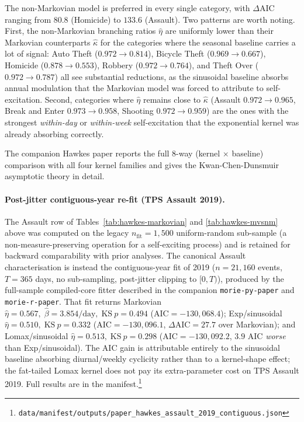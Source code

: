 \documentclass[article,shortnames,nojss]{jss}
\begin{document}
The non-Markovian model is preferred in every single category, with
$\Delta\mathrm{AIC}$ ranging from $80.8$ (Homicide) to $133.6$
(Assault).  Two patterns are worth noting.  First, the
non-Markovian branching ratios $\hat\eta$ are uniformly lower than
their Markovian counterparts $\hat\kappa$ for the categories where
the seasonal baseline carries a lot of signal: Auto Theft
($0.972 \to 0.814$), Bicycle Theft ($0.969 \to 0.667$), Homicide
($0.878 \to 0.553$), Robbery ($0.972 \to 0.764$), and Theft Over
($0.972 \to 0.787$) all see substantial reductions, as the
sinusoidal baseline absorbs annual modulation that the Markovian
model was forced to attribute to self-excitation.  Second,
categories where $\hat\eta$ remains close to $\hat\kappa$
(Assault $0.972 \to 0.965$, Break and Enter $0.973 \to 0.958$,
Shooting $0.972 \to 0.959$) are the ones with the strongest
\emph{within-day} or \emph{within-week} self-excitation that the
exponential kernel was already absorbing correctly.

The companion Hawkes paper \citep{Ruhela2026Hawkes} reports the full 8-way
(kernel $\times$ baseline) comparison with all four kernel families
and gives the Kwan-Chen-Dunsmuir asymptotic theory in detail.

\paragraph{Post-jitter contiguous-year re-fit (TPS Assault 2019).}
The Assault row of Tables~\ref{tab:hawkes-markovian} and
\ref{tab:hawkes-mvsnm} above was computed on the legacy
$n_{\text{fit}}=1{,}500$ uniform-random sub-sample (a
non-measure-preserving operation for a self-exciting process)
and is retained for backward comparability with prior
analyses.  The canonical Assault characterisation is instead the
contiguous-year fit of 2019 ($n=21{,}160$ events,
$T=365$ days, no sub-sampling, post-jitter clipping to $[0,T)$),
produced by the full-sample compiled-core fitter described in the
companion \texttt{morie-py-paper} and \texttt{morie-r-paper}.
That fit returns Markovian
$\hat\eta=0.567,\;\hat\beta=3.854/\text{day},\;\text{KS}~p=0.494$
($\text{AIC}=-130{,}068.4$); Exp/sinusoidal
$\hat\eta=0.510,\;\text{KS}~p=0.332$
($\text{AIC}=-130{,}096.1$, $\Delta\text{AIC}=27.7$ over
Markovian); and Lomax/sinusoidal $\hat\eta=0.513,\;\text{KS}~p=0.298$
($\text{AIC}=-130{,}092.2$, $3.9$ AIC \emph{worse} than
Exp/sinusoidal).  The AIC gain is attributable entirely to the
sinusoidal baseline absorbing diurnal/weekly cyclicity rather
than to a kernel-shape effect; the fat-tailed Lomax kernel does
not pay its extra-parameter cost on TPS Assault 2019.  Full results are
in the manifest.\footnote{\texttt{data/manifest/outputs/paper\_hawkes\_assault\_2019\_contiguous.json}}
\end{document}
